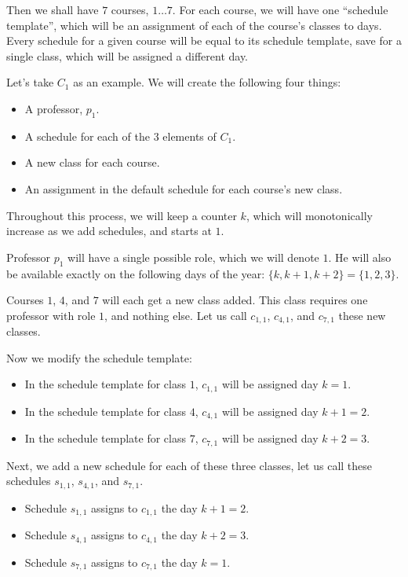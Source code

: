 Then we shall have $7$ courses, $1 \dots 7$. For each course, we will have one ``schedule template'', which will be an assignment of each of the course's classes to days. Every schedule for a given course will be equal to its schedule template, save for a single class, which will be assigned a different day.

Let's take {\color{BrickRed}$C_1$} as an example. We will create the following four things:
\begin{itemize}
\item A professor, $p_1$.
\item A schedule for each of the $3$ elements of {\color{BrickRed}$C_1$}.
\item A new class for each course.
\item An assignment in the default schedule for each course's new class.
\end{itemize}

Throughout this process, we will keep a counter $k$, which will monotonically increase as we add schedules, and starts at $1$.

Professor $p_1$ will have a single possible role, which we will denote $1$. He will also be available exactly on the following days of the year: $\{k, k + 1, k + 2\} = \{1, 2, 3\}$.

Courses $1$, $4$, and $7$ will each get a new class added. This class requires one professor with role $1$, and nothing else. Let us call $c_{1, 1}$, $c_{4, 1}$, and $c_{7, 1}$ these new classes.

Now we modify the schedule template:
\begin{itemize}
\item In the schedule template for class $1$, $c_{1, 1}$ will be assigned day $k = 1$.
\item In the schedule template for class $4$, $c_{4, 1}$ will be assigned day $k + 1 = 2$.
\item In the schedule template for class $7$, $c_{7, 1}$ will be assigned day $k + 2 = 3$.
\end{itemize}

Next, we add a new schedule for each of these three classes, let us call these schedules $s_{1, 1}$, $s_{4, 1}$, and $s_{7, 1}$.
\begin{itemize}
\item Schedule $s_{1, 1}$ assigns to $c_{1, 1}$ the day $k + 1 = 2$.
\item Schedule $s_{4, 1}$ assigns to $c_{4, 1}$ the day $k + 2 = 3$.
\item Schedule $s_{7, 1}$ assigns to $c_{7, 1}$ the day $k = 1$.
\end{itemize}

